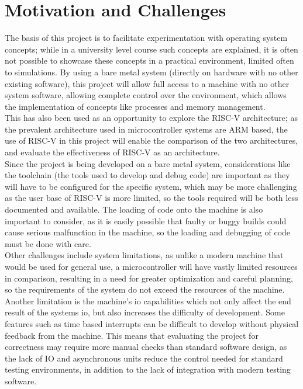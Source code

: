 \section{Motivation and Challenges}
The basis of this project is to facilitate experimentation with operating system concepts; while in a university level course such concepts are explained, it is often not possible to showcase these concepts in a practical environment, limited often to simulations. By using a bare metal system (directly on hardware with no other existing software), this project will allow full access to a machine with no other system software, allowing complete control over the environment, which allows the implementation of concepts like processes and memory management. \\
This has also been used as an opportunity to explore the RISC-V architecture; as the prevalent architecture used in microcontroller systems are ARM based, the use of RISC-V in this project will enable the comparison of the two architectures, and evaluate the effectiveness of RISC-V as an architecture.\\
Since the project is being developed on a bare metal system, considerations like the toolchain (the tools used to develop and debug code) are important as they will have to be configured for the specific system, which may be more challenging as the user base of RISC-V is more limited, so the tools required will be both less documented and available. The loading of code onto the machine is also important to consider, as it is easily possible that faulty or buggy builds could cause serious malfunction in the machine, so the loading and debugging of code must be done with care.\\
Other challenges include system limitations, as unlike a modern machine that would be used for general use, a microcontroller will have vastly limited resources in comparison, resulting in a need for greater optimization and careful planning, so the requirements of the system do not exceed the resources of the machine. Another limitation is the machine's \ac{io} capabilities which not only affect the end result of the systems \ac{io}, but also increases the difficulty of development. Some features such as time based interrupts can be difficult to develop without physical feedback from the machine. This means that evaluating the project for correctness may require more manual checks than standard software design, as the lack of IO and asynchronous units reduce the control needed for standard testing environments, in addition to the lack of integration with modern testing software.


